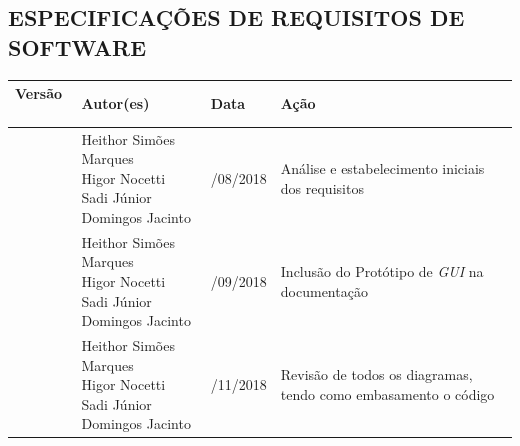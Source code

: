 \documentclass[12pt,a4paper,brazil,abntex2]{article}
\begin{document}
\newpage

\begin{center}

\section*{\normalsize ESPECIFICAÇÕES DE REQUISITOS DE SOFTWARE}
\thispagestyle{empty}
\end{center}

		\begin{table}[h]
			\begin{center}
			\begin{tabular}{|p{2cm}|p{4.5cm}|p{2cm}|p{4cm}|}
			\hline
				{\bf Versão} \	& {\bf Autor(es)}				& {\bf Data} 	& {\bf Ação}	\\\hline
				\parbox[c][\linewidth][c]{\linewidth}{} &
				\parbox[c][\linewidth][c]{\linewidth}{\centering Heithor Simões Marques\newline
								    							    Higor Nocetti\newline
								  							    Sadi Júnior Domingos Jacinto}&
				\parbox[c][\linewidth][c]{\linewidth}{/08/2018} &
				\parbox[c][\linewidth][c]{\linewidth}{\centering Análise e estabelecimento iniciais dos requisitos}\\\hline 
				
				\parbox[c][\linewidth][c]{\linewidth}{} &
				\parbox[c][\linewidth][c]{\linewidth}{\centering Heithor Simões Marques\newline
								    							    Higor Nocetti\newline
								  							    Sadi Júnior Domingos Jacinto}&
				\parbox[c][\linewidth][c]{\linewidth}{/09/2018} &
				\parbox[c][\linewidth][c]{\linewidth}{\centering Inclusão do Protótipo de \textit{GUI} na documentação}\\\hline
				
				\parbox[c][\linewidth][c]{\linewidth}{} &
				\parbox[c][\linewidth][c]{\linewidth}{\centering Heithor Simões Marques\newline
								    							    Higor Nocetti\newline
								  							    Sadi Júnior Domingos Jacinto}&
				\parbox[c][\linewidth][c]{\linewidth}{/11/2018} &
				\parbox[c][\linewidth][c]{\linewidth}{\centering Revisão de todos os diagramas, tendo como embasamento o código}\\\hline 
			\end{tabular}
			\end{center}
		\end{table}
\newpage
\end{document}
